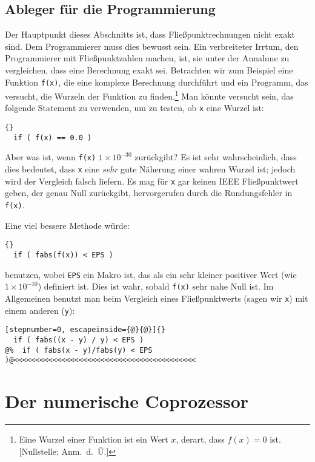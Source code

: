 \subsection{Ableger f\"{u}r die Programmierung}

Der Hauptpunkt dieses Abschnitts ist, dass Flie{\ss}punktrechnungen
nicht exakt sind. Dem Programmierer muss dies bewusst sein. Ein
verbreiteter Irrtum, den Programmierer mit Flie{\ss}punktzahlen machen,
ist, sie unter der Annahme zu vergleichen, dass eine Berechnung
exakt sei. Betrachten wir zum Beispiel eine Funktion
\lstinline|f(x)|, die eine komplexe Berechnung durchf\"{u}hrt und ein
Programm, das versucht, die Wurzeln der Funktion zu
finden.\footnote{Eine Wurzel einer Funktion ist ein Wert $x$,
derart, dass $f(x) = 0$ ist. [Nullstelle; Anm.\ d.\ \"{U}\@.]} Man
k\"{o}nnte versucht sein, das folgende Statement zu verwenden, um zu
testen, ob \lstinline|x| eine Wurzel ist:
\begin{lstlisting}[stepnumber=0]{}
  if ( f(x) == 0.0 )
\end{lstlisting}
Aber was ist, wenn \lstinline|f(x)| $1 \times 10^{-30}$ zur\"{u}ckgibt?
Es ist sehr wahrscheinlich, dass dies bedeutet, dass \lstinline|x|
eine \emph{sehr} gute N\"{a}herung einer wahren Wurzel ist; jedoch wird
der Vergleich falsch liefern. Es mag f\"{u}r \lstinline|x| gar keinen
IEEE Flie{\ss}punktwert geben, der genau Null zur\"{u}ckgibt, hervorgerufen
durch die Rundungsfehler in \lstinline|f(x)|. \pagebreak[1]

Eine viel bessere Methode w\"{u}rde:
\begin{lstlisting}[stepnumber=0]{}
  if ( fabs(f(x)) < EPS )
\end{lstlisting}
benutzen, wobei \lstinline|EPS| ein Makro ist, das als ein sehr
kleiner positiver Wert (wie $1 \times 10^{-10}$) definiert ist. Dies
ist wahr, sobald \lstinline|f(x)| sehr nahe Null ist. Im Allgemeinen
benutzt man beim Vergleich eines Flie{\ss}punktwerts (sagen wir
\lstinline|x|) mit einem anderen (\lstinline|y|):
\begin{lstlisting}[stepnumber=0, escapeinside={@}{@}]{}
  if ( fabs((x - y) / y) < EPS )
@%  if ( fabs(x - y)/fabs(y) < EPS )@<<<<<<<<<<<<<<<<<<<<<<<<<<<<<<<<<<<<<<<<<<
\end{lstlisting}

\section{Der numerische Coprozessor}
